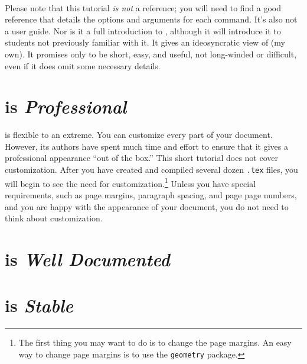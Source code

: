 \documentclass[letterpaper]{article}
\begin{document}
    \paragraph{}Please note that this tutorial \textit{is not} a \LaTeXe{} reference; you will need to find a good reference that details the options and arguments for each command. It's also not a user guide. Nor is it a full introduction to \LaTeXe{}, although it will introduce it to students not previously familiar with it. It gives an ideosyncratic view of \LaTeXe{} (my own). It promises only to be short, easy, and useful, not long-winded or difficult, even if it does omit some necessary details. 

    

    \section*{\LaTeXe{} is \textit{Professional}}

    \LaTeXe{} is flexible to an extreme. You can customize every part of your document. However, its authors have spent much time and effort to ensure that it gives a professional appearance ``out of the box.'' This short tutorial does not cover customization. After you have created and compiled several dozen \texttt{.tex} files, you will begin to see the need for customization.\footnote{The first thing you may want to do is to change the page margins. An easy way to change page margins is to use the \texttt{geometry} package.} Unless you have special requirements, such as page margins, paragraph spacing, and page page numbers, and you are happy with the appearance of your document, you do not need to think about customization.

    

    \section*{\LaTeXe{} is \textit{Well Documented}}

    

    \section*{\LaTeXe{} is \textit{Stable}}
\end{document}
